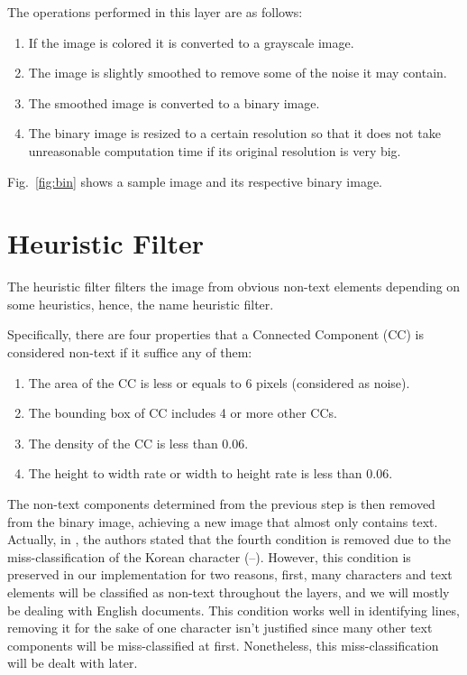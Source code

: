 \documentclass[12pt]{report}
\begin{document}
    The operations performed in this layer are as follows:
    \begin{enumerate}
        \item If the image is colored it is converted to a grayscale image.
        \item The image is slightly smoothed to remove some of the noise it may contain.
        \item The smoothed image is converted to a binary image.
        \item The binary image is resized to a certain resolution so that it does not take
        unreasonable computation time if its original resolution is very big.
    \end{enumerate}

    Fig.~\ref{fig:bin} shows a sample image and its respective binary image.


    \section{Heuristic Filter}

    The heuristic filter filters the image from obvious non-text elements depending on some heuristics, hence, the name
    heuristic filter.

    Specifically, there are four properties that a Connected Component (CC) is considered non-text if it suffice any of them:
    \begin{enumerate}
        \item The area of the CC is less or equals to 6 pixels (considered as noise).
        \item The bounding box of CC includes 4 or more other CCs.
        \item The density of the CC is less than 0.06.
        \item The height to width rate or width to height rate is less than 0.06.
    \end{enumerate}
    
    The non-text components determined from the previous step is then removed from the binary image, achieving a new image
    that almost only contains text.
    Actually, in \cite{mhs}, the authors stated that the fourth condition is removed due to the miss-classification of the Korean
    character (--).
    However, this condition is preserved in our implementation for two reasons, first, many characters and text
    elements will be classified as non-text throughout the layers, and we will mostly be dealing with English documents.
    This condition works well in identifying lines, removing it for the sake of one character isn't justified since many other text
    components will be miss-classified at first. Nonetheless, this miss-classification will be dealt with later.
\end{document}
